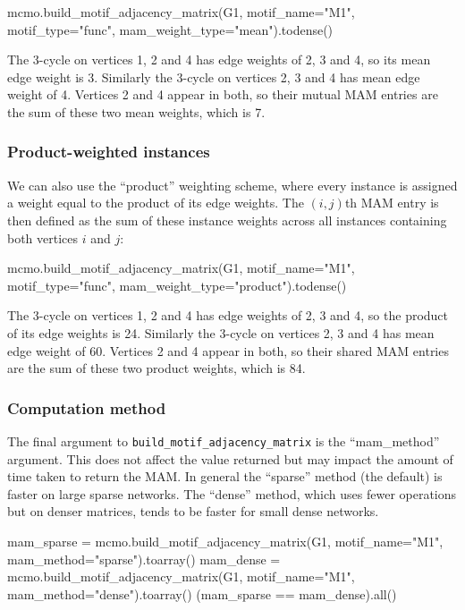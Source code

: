 \documentclass{article}
\begin{document}
\begin{pyconsole}
mcmo.build_motif_adjacency_matrix(G1, motif_name="M1",
  motif_type="func", mam_weight_type="mean").todense()
\end{pyconsole}

The 3-cycle on vertices 1, 2 and 4
has edge weights of 2, 3 and 4, so its mean edge weight is 3.
Similarly the 3-cycle on vertices 2, 3 and 4 has mean edge weight of 4.
Vertices 2 and 4 appear in both, so their mutual MAM entries are the
sum of these two mean weights, which is 7.

\subsubsection{Product-weighted instances}

We can also use the ``product'' weighting scheme,
where every instance is assigned a weight equal to the
product of its edge weights.
The $(i,j)$th MAM entry is then defined as the sum of these
instance weights across all instances containing
both vertices $i$ and $j$:

\begin{pyconsole}
mcmo.build_motif_adjacency_matrix(G1, motif_name="M1",
  motif_type="func", mam_weight_type="product").todense()
\end{pyconsole}

The 3-cycle on vertices 1, 2 and 4
has edge weights of 2, 3 and 4, so the product of its edge weights is 24.
Similarly the 3-cycle on vertices 2, 3 and 4 has mean edge weight of 60.
Vertices 2 and 4 appear in both, so their shared MAM entries are the
sum of these two product weights, which is 84.

\subsubsection{Computation method}

The final argument to \texttt{build\_motif\_adjacency\_matrix}
is the ``mam\_method'' argument.
This does not affect the value returned but may impact the
amount of time taken to return the MAM.
In general the ``sparse'' method (the default)
is faster on large sparse networks.
The ``dense'' method, which uses fewer operations but on
denser matrices, tends to be faster for small dense networks.


\begin{pyconsole}
mam_sparse = mcmo.build_motif_adjacency_matrix(G1, motif_name="M1",
  mam_method="sparse").toarray()
mam_dense  = mcmo.build_motif_adjacency_matrix(G1, motif_name="M1",
  mam_method="dense").toarray()
(mam_sparse == mam_dense).all()
\end{pyconsole}
\end{document}
